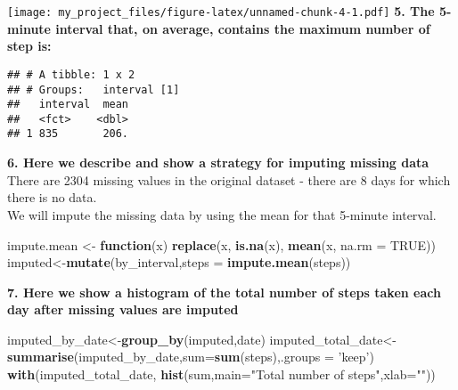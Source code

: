 \documentclass[]{article}
\newenvironment{Shaded}{\begin{snugshade}}{\end{snugshade}}
\newcommand{\ControlFlowTok}[1]{\textcolor[rgb]{0.13,0.29,0.53}{\textbf{#1}}}
\newcommand{\DataTypeTok}[1]{\textcolor[rgb]{0.13,0.29,0.53}{#1}}
\newcommand{\KeywordTok}[1]{\textcolor[rgb]{0.13,0.29,0.53}{\textbf{#1}}}
\newcommand{\NormalTok}[1]{#1}
\newcommand{\OperatorTok}[1]{\textcolor[rgb]{0.81,0.36,0.00}{\textbf{#1}}}
\newcommand{\OtherTok}[1]{\textcolor[rgb]{0.56,0.35,0.01}{#1}}
\newcommand{\StringTok}[1]{\textcolor[rgb]{0.31,0.60,0.02}{#1}}
\begin{document}
\texttt{[image: my\_project\_files/figure-latex/unnamed-chunk-4-1.pdf]}
\textbf{5. The 5-minute interval that, on average, contains the maximum
number of step is:}

\begin{Shaded}
\end{Shaded}

\begin{verbatim}
## # A tibble: 1 x 2
## # Groups:   interval [1]
##   interval  mean
##   <fct>    <dbl>
## 1 835       206.
\end{verbatim}

\textbf{6. Here we describe and show a strategy for imputing missing
data}\\
There are 2304 missing values in the original dataset - there are 8 days
for which there is no data.\\
We will impute the missing data by using the mean for that 5-minute
interval.

\begin{Shaded}
\begin{Highlighting}[]
\NormalTok{impute.mean <-}\StringTok{ }\ControlFlowTok{function}\NormalTok{(x) }\KeywordTok{replace}\NormalTok{(x, }\KeywordTok{is.na}\NormalTok{(x), }\KeywordTok{mean}\NormalTok{(x, }\DataTypeTok{na.rm =} \OtherTok{TRUE}\NormalTok{))}
\NormalTok{imputed<-}\KeywordTok{mutate}\NormalTok{(by_interval,}\DataTypeTok{steps =} \KeywordTok{impute.mean}\NormalTok{(steps))}
\end{Highlighting}
\end{Shaded}

\textbf{7. Here we show a histogram of the total number of steps taken
each day after missing values are imputed}

\begin{Shaded}
\begin{Highlighting}[]
\NormalTok{imputed_by_date<-}\KeywordTok{group_by}\NormalTok{(imputed,date)}
\NormalTok{imputed_total_date<-}\KeywordTok{summarise}\NormalTok{(imputed_by_date,}\DataTypeTok{sum=}\KeywordTok{sum}\NormalTok{(steps),}\DataTypeTok{.groups =} \StringTok{'keep'}\NormalTok{)}
\KeywordTok{with}\NormalTok{(imputed_total_date, }\KeywordTok{hist}\NormalTok{(sum,}\DataTypeTok{main=}\StringTok{"Total number of steps"}\NormalTok{,}\DataTypeTok{xlab=}\StringTok{""}\NormalTok{))}
\end{Highlighting}
\end{Shaded}
\end{document}
